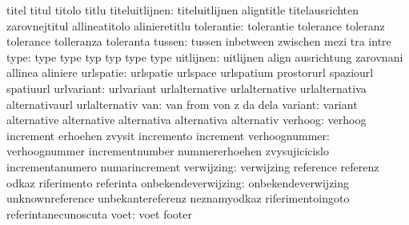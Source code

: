                            titel                     titul
                           titolo                    titlu
           titeluitlijnen: titeluitlijnen            aligntitle
                           titelausrichten           zarovnejtitul
                           allineatitolo             alinieretitlu
               tolerantie: tolerantie                tolerance
                           toleranz                  tolerance
                           tolleranza                toleranta
                   tussen: tussen                    inbetween
                           zwischen                  mezi
                           tra                       intre
                     type: type                      type
                           typ                       typ
                           type                      type %
                uitlijnen: uitlijnen                 align
                           ausrichtung               zarovnani
                           allinea                   aliniere
                urlspatie: urlspatie                 urlspace
                           urlspatium                prostorurl
                           spaziourl                 spatiuurl
               urlvariant: urlvariant                urlalternative
                           urlalternative            urlalternativa
                           alternativaurl            urlalternativ
                      van: van                       from
                           von                       z
                           da                        dela
                  variant: variant                   alternative
                           alternative               alternativa
                           alternativa               alternativ
                  verhoog: verhoog                   increment
                           erhoehen                  zvysit
                           incremento                increment %
            verhoognummer: verhoognummer             incrementnumber
                           nummererhoehen            zvysujicicislo
                           incrementanumero          numarincrement
               verwijzing: verwijzing                reference
                           referenz                  odkaz
                           riferimento               referinta
      onbekendeverwijzing: onbekendeverwijzing       unknownreference
                           unbekantereferenz         neznamyodkaz
                           riferimentoingoto         referintanecunoscuta
                     voet: voet                      footer
